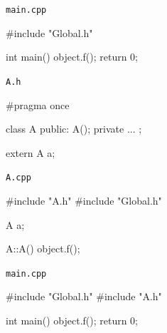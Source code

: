 \newsavebox\mainAcpp
\begin{lrbox}{\mainAcpp}%
\begin{minipage}[\baselineskip]{\codewidth}
\texttt{main.cpp}
\begin{cppcode}[numbers = none]
#include "Global.h"



int main() {
  object.f();
  return 0;
}
\end{cppcode}
\end{minipage}%
\end{lrbox}

\newsavebox\globalBh
\begin{lrbox}{\globalBh}%
\begin{minipage}[\baselineskip]{\codewidth}
\texttt{A.h}
\begin{cppcode}[numbers = none]
#pragma once

class A {
public:
  A();
private
  ...
};

extern A a;
\end{cppcode}
\end{minipage}%
\end{lrbox}

\newsavebox\globalBcpp
\begin{lrbox}{\globalBcpp}%
\begin{minipage}[\baselineskip]{\codewidth}
\texttt{A.cpp}
\begin{cppcode}[numbers = none]
#include "A.h"
#include "Global.h"

A a;

A::A() {
  object.f();
}
\end{cppcode}
\end{minipage}%
\end{lrbox}

\newsavebox\mainBcpp
\begin{lrbox}{\mainBcpp}%
\begin{minipage}[\baselineskip]{\codewidth}
\texttt{main.cpp}
\begin{cppcode}[numbers = none]
#include "Global.h"
#include "A.h"


int main() {
  object.f();
  return 0;
}
\end{cppcode}
\end{minipage}%
\end{lrbox}

